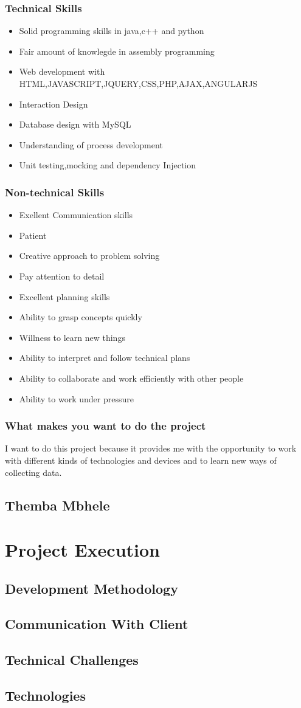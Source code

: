 \documentclass{scrartcl}
\begin{document}
\subsubsection{Technical Skills}
\begin{itemize}
\item Solid programming skills in java,c++ and python
\item Fair amount of knowlegde in assembly programming
\item Web development with HTML,JAVASCRIPT,JQUERY,CSS,PHP,AJAX,ANGULARJS
\item Interaction Design
\item Database design with MySQL
\item Understanding of process development
\item Unit testing,mocking and dependency Injection
\end{itemize}
\subsubsection{Non-technical Skills}
\begin{itemize}
\item Exellent Communication skills
\item Patient
\item Creative approach to problem solving
\item Pay attention to detail
\item Excellent planning skills
\item Ability to grasp concepts quickly
\item Willness to learn new things
\item Ability to interpret and follow technical plans
\item Ability to collaborate and work efficiently with other people
\item Ability to work under pressure
\end{itemize}
\subsubsection{What makes you want to do the project}
I want to do this project because it provides me with the opportunity to work with different kinds of technologies and devices and to learn new ways of collecting data.
\subsection{Themba Mbhele}
\section{Project Execution}
\subsection{Development Methodology}
\subsection{Communication With Client}
\subsection{Technical Challenges}
\subsection{Technologies}
\end{document}
